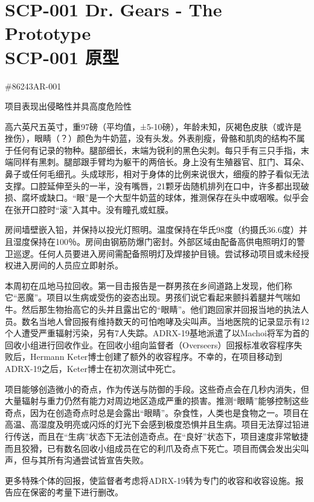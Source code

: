 \chapter[SCP-001 原型]{
	SCP-001 Dr. Gears - The Prototype \\
	SCP-001 原型
}

\label{chap:SCP-001.the.prototype}

\#86243AR-001

项目表现出侵略性并具高度危险性


高六英尺五英寸，重97磅（平均值，±5-10磅），年龄未知，灰褐色皮肤（或许是挫伤），眼睛（？）颜色为牛奶蓝，没有头发。外表削瘦，骨骼和肌肉的结构不属于任何有记录的物种。腿部细长，末端为锐利的黑色尖刺。每只手有三只手指，末端同样有黑刺。腿部跟手臂均为躯干的两倍长。身上没有生殖器官、肛门、耳朵、鼻子或任何毛细孔。头成球形，相对于身体的比例来说很大，细瘦的脖子看似无法支撑。口腔延伸至头的一半，没有嘴唇，21颗牙齿随机排列在口中，许多都出现破损、腐坏或缺口。“眼”是一个大型牛奶蓝的球体，推测保存在头中或咽喉。似乎会在张开口腔时“滚”入其中。没有瞳孔或虹膜。


房间墙壁嵌入铅，并保持以投光灯照明。温度保持在华氏98度（约摄氏36.6度）并且湿度保持在100％。房间由钢筋防爆门密封。外部区域由配备高供电照明灯的警卫巡逻。任何人员要进入房间需配备照明灯及焊接护目镜。尝试移动项目或未经授权进入房间的人员应立即射杀。


本周初在瓜地马拉回收。第一目击报告是一群男孩在乡间道路上发现，他们称它“恶魔”。项目以生病或受伤的姿态出现。男孩们说它看起来颤抖着腿并气喘如牛。然后那生物抬高它的头并且露出它的“眼睛”。他们跑回家并回报当地的执法人员。数名当地人曾回报有维持数天的可怕咆哮及尖叫声。当地医院的记录显示有12个人遭受严重辐射污染，另有7人失踪。ADRX-19基地派遣了以Machoi将军为首的回收小组进行回收作业。在回收小组向监督者（Overseers）回报标准收容程序失败后，Hermann Keter博士创建了额外的收容程序。不幸的，在项目移动到ADRX-19之后，Keter博士在初次测试中死亡。

项目能够创造微小的奇点，作为传送与防御的手段。这些奇点会在几秒内消失，但大量辐射与重力仍然有能力对周边地区造成严重的损害。推测“眼睛”能够控制这些奇点，因为在创造奇点时总是会露出“眼睛”。杂食性，人类也是食物之一。项目在高温、高湿度及明亮或闪烁的灯光下会感到极度恐惧并且生病。项目无法穿过铅进行传送，而且在“生病”状态下无法创造奇点。在“良好”状态下，项目速度非常敏捷而且狡猾，已有数名回收小组成员在它的利爪及奇点下死亡。项目而偶会发出尖叫声，但与其所有沟通尝试皆宣告失败。

更多特殊个体的回报，使监督者考虑将ADRX-19转为专门的收容和收容设施。报告应在保密的考量下进行删改。
